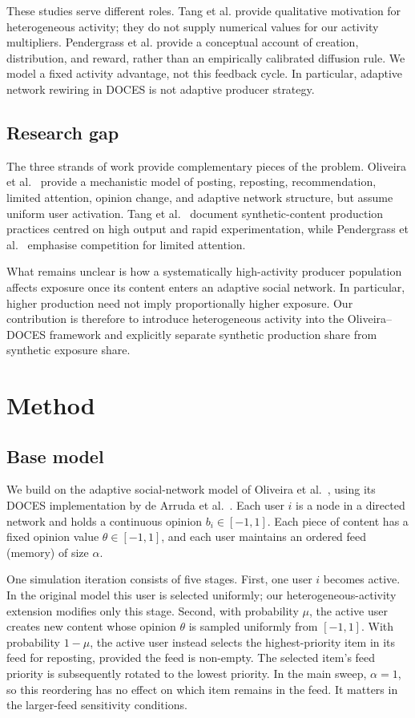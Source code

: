 \documentclass[runningheads]{llncs}
\begin{document}
These studies serve different roles. Tang et al. provide qualitative motivation for heterogeneous activity; they do not supply numerical values for our activity multipliers. Pendergrass et al. provide a conceptual account of creation, distribution, and reward, rather than an empirically calibrated diffusion rule. We model a fixed activity advantage, not this feedback cycle. In particular, adaptive network rewiring in DOCES is not adaptive producer strategy.

\subsection{Research gap}

The three strands of work provide complementary pieces of the problem. Oliveira et al.~\cite{oliveira2026} provide a mechanistic model of posting, reposting, recommendation, limited attention, opinion change, and adaptive network structure, but assume uniform user activation. Tang et al.~\cite{tang2026} document synthetic-content production practices centred on high output and rapid experimentation, while Pendergrass et al.~\cite{pendergrass2025} emphasise competition for limited attention.

What remains unclear is how a systematically high-activity producer population affects exposure once its content enters an adaptive social network. In particular, higher production need not imply proportionally higher exposure. Our contribution is therefore to introduce heterogeneous activity into the Oliveira--DOCES framework and explicitly separate synthetic production share from synthetic exposure share.

\section{Method}

\subsection{Base model}

We build on the adaptive social-network model of Oliveira et al.~\cite{oliveira2026}, using its DOCES implementation by de Arruda et al.~\cite{deArruda2025}. Each user \(i\) is a node in a directed network and holds a continuous opinion \(b_i\in[-1,1]\). Each piece of content has a fixed opinion value \(\theta\in[-1,1]\), and each user maintains an ordered feed (memory) of size \(\alpha\).

One simulation iteration consists of five stages. First, one user \(i\) becomes active. In the original model this user is selected uniformly; our heterogeneous-activity extension modifies only this stage. Second, with probability \(\mu\), the active user creates new content whose opinion \(\theta\) is sampled uniformly from \([-1,1]\). With probability \(1-\mu\), the active user instead selects the highest-priority item in its feed for reposting, provided the feed is non-empty. The selected item's feed priority is subsequently rotated to the lowest priority. In the main sweep, \(\alpha=1\), so this reordering has no effect on which item remains in the feed. It matters in the larger-feed sensitivity conditions.
\end{document}
